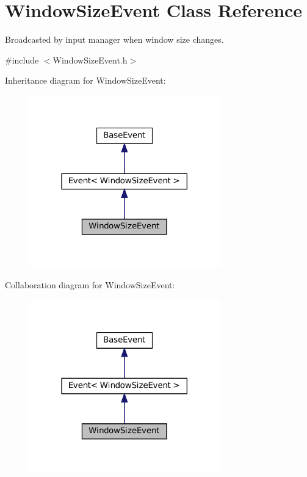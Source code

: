 \hypertarget{classWindowSizeEvent}{}\section{Window\+Size\+Event Class Reference}
\label{classWindowSizeEvent}


Broadcasted by input manager when window size changes.  




{\ttfamily \#include $<$Window\+Size\+Event.\+h$>$}



Inheritance diagram for Window\+Size\+Event\+:
\nopagebreak
\begin{figure}[H]
\begin{center}
\leavevmode
\includegraphics[width=234pt]{classWindowSizeEvent__inherit__graph}
\end{center}
\end{figure}


Collaboration diagram for Window\+Size\+Event\+:
\nopagebreak
\begin{figure}[H]
\begin{center}
\leavevmode
\includegraphics[width=234pt]{classWindowSizeEvent__coll__graph}
\end{center}
\end{figure}
